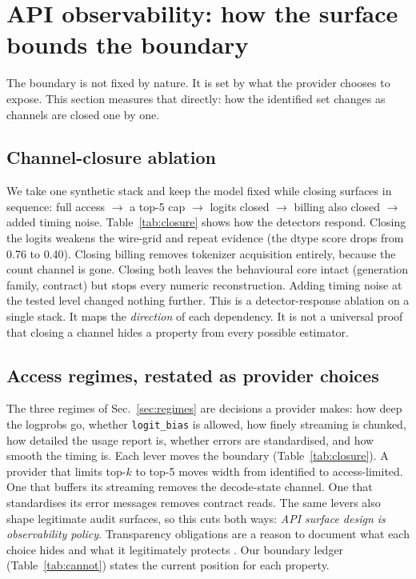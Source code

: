 \section{API observability: how the surface bounds the boundary}
\label{sec:observability}
The boundary is not fixed by nature.  It is set by what the provider chooses to expose.
This section measures that directly: how the identified set changes as channels are
closed one by one.

\subsection{Channel-closure ablation}
We take one synthetic stack and keep the model fixed while closing surfaces in
sequence: full access $\to$ a top-5 cap $\to$ logits closed $\to$ billing also closed
$\to$ added timing noise.  Table~\ref{tab:closure} shows how the detectors respond.
Closing the logits weakens the wire-grid and repeat evidence (the dtype score drops from
0.76 to 0.40).  Closing billing removes tokenizer acquisition entirely, because the
count channel is gone.  Closing both leaves the behavioural core intact (generation
family, contract) but stops every numeric reconstruction.  Adding timing noise at the
tested level changed nothing further.  This is a detector-response ablation on a single
stack.  It maps the \emph{direction} of each dependency.  It is not a universal proof
that closing a channel hides a property from every possible estimator.

\begin{table}[t]\centering\small
\caption{Same-model channel closure: settled-property count and key detector scores as
surfaces close.  ``--'' = channel absent, property unmeasurable.}
\label{tab:closure}

\end{table}

\subsection{Access regimes, restated as provider choices}
The three regimes of Sec.~\ref{sec:regimes} are decisions a provider makes: how deep
the logprobs go, whether \texttt{logit\_bias} is allowed, how finely streaming is
chunked, how detailed the usage report is, whether errors are standardised, and how
smooth the timing is.  Each lever moves the boundary (Table~\ref{tab:closure}).  A
provider that limits top-$k$ to top-5 moves width from identified to access-limited.
One that buffers its streaming removes the decode-state channel.  One that standardises
its error messages removes contract reads.  The same levers also shape legitimate audit
surfaces, so this cuts both ways: \emph{API surface design is observability policy}.
Transparency obligations are a reason to document what each choice hides and what it
legitimately protects \cite{euaiact2024,bommasani2023fmti}.  Our boundary ledger
(Table~\ref{tab:cannot}) states the current position for each property.

